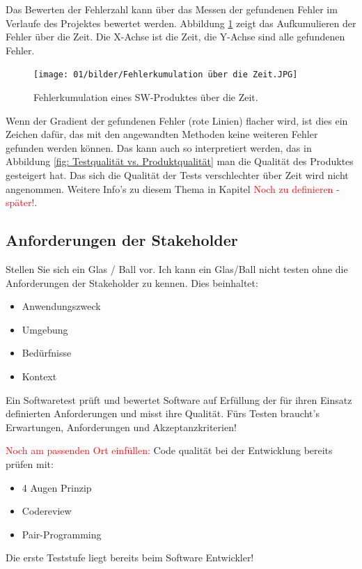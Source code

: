 Das Bewerten der Fehlerzahl kann über das Messen der gefundenen Fehler im Verlaufe des Projektes bewertet werden. Abbildung \ref{fig: Fehlerkumulation über die Zeit} zeigt das Aufkumulieren der Fehler über die Zeit. Die X-Achse ist die Zeit, die Y-Achse sind alle gefundenen Fehler.

\begin{figure}[H]
	\centering
	\texttt{[image: 01/bilder/Fehlerkumulation über die Zeit.JPG]}
	\caption{Fehlerkumulation eines SW-Produktes über die Zeit.}
	\label{fig: Fehlerkumulation über die Zeit}
\end{figure}

Wenn der Gradient der gefundenen Fehler (rote Linien) flacher wird, ist dies ein Zeichen dafür, das mit den angewandten Methoden keine weiteren Fehler gefunden werden können. Das kann auch so interpretiert werden, das in Abbildung \ref{fig: Testqualität vs. Produktqualität} man die Qualität des Produktes gesteigert hat. Das sich die Qualität der Tests verschlechter über Zeit wird nicht angenommen.
Weitere Info's zu diesem Thema in Kapitel \textcolor{red}{Noch zu definieren - später!}.

\subsection{Anforderungen der Stakeholder}
Stellen Sie sich ein Glas / Ball vor. Ich kann ein Glas/Ball nicht testen ohne die Anforderungen der Stakeholder zu kennen. Dies beinhaltet:
\begin{itemize}
    \item Anwendungszweck
    \item Umgebung
    \item Bedürfnisse
    \item Kontext
\end{itemize}

Ein Softwaretest prüft und bewertet Software auf Erfüllung der für ihren Einsatz definierten Anforderungen und misst ihre Qualität. Fürs Testen braucht's Erwartungen, Anforderungen und Akzeptanzkriterien!

\textcolor{red}{Noch am passenden Ort einfüllen:}
Code qualität bei der Entwicklung bereits prüfen mit:
\begin{itemize}
    \item 4 Augen Prinzip
    \item Codereview
    \item Pair-Programming
\end{itemize}

Die erste Teststufe liegt bereits beim Software Entwickler!
